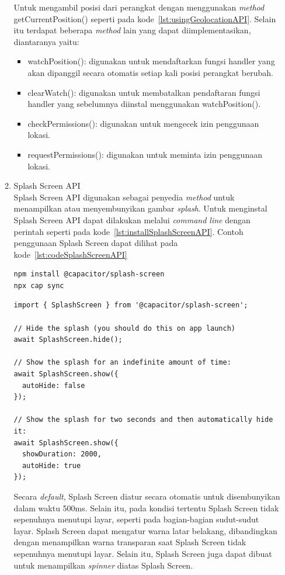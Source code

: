 \begin{enumerate}
\begin{enumerate}
		Untuk mengambil posisi dari perangkat dengan menggunakan \textit{method} getCurrentPosition() seperti pada kode~\ref{lst:usingGeolocationAPI}. Selain itu terdapat beberapa \textit{method} lain yang dapat diimplementasikan, diantaranya yaitu:
			\begin{itemize}
				\item watchPosition(): digunakan untuk mendaftarkan fungsi handler yang akan dipanggil secara otomatis setiap kali posisi perangkat berubah.
				\item clearWatch(): digunakan untuk membatalkan pendaftaran fungsi handler yang sebelumnya diinstal menggunakan watchPosition().
				\item checkPermissions(): digunakan untuk mengecek izin penggunaan lokasi.
				\item requestPermissions(): digunakan untuk meminta izin penggunaan lokasi.
			\end{itemize}
			\item Splash Screen API	\\
			Splash Screen API digunakan sebagai penyedia \textit{method} untuk menampilkan atau menyembunyikan gambar \textit{splash}. Untuk menginstal Splash Screen API dapat dilakukan melalui \textit{command line} dengan perintah seperti pada kode~\ref{lst:installSplashScreenAPI}. Contoh penggunaan Splash Screen dapat dilihat pada kode~\ref{lst:codeSplashScreenAPI}
\begin{lstlisting}[label={lst:installSplashScreenAPI}, caption=Kode untuk Menginstal Splash Screen API]
npm install @capacitor/splash-screen
npx cap sync
\end{lstlisting}

\begin{lstlisting}[label={lst:codeSplashScreenAPI}, caption=Contoh Kode Penggunaan Splash Screen API]
import { SplashScreen } from '@capacitor/splash-screen';

// Hide the splash (you should do this on app launch)
await SplashScreen.hide();

// Show the splash for an indefinite amount of time:
await SplashScreen.show({
  autoHide: false
});

// Show the splash for two seconds and then automatically hide it:
await SplashScreen.show({
  showDuration: 2000,
  autoHide: true
});
\end{lstlisting}
			
			Secara \textit{default}, Splash Screen diatur secara otomatis untuk disembunyikan dalam waktu 500ms. Selain itu, pada kondisi tertentu Splash Screen tidak sepenuhnya menutupi layar, seperti pada bagian-bagian sudut-sudut layar. Splash Screen dapat mengatur warna latar belakang, dibandingkan dengan menampilkan warna transparan saat Splash Screen tidak sepenuhnya menutupi layar. Selain itu, Splash Screen juga dapat dibuat untuk menampilkan \textit{spinner} diatas Splash Screen. 
		

\end{enumerate}
\end{enumerate}
